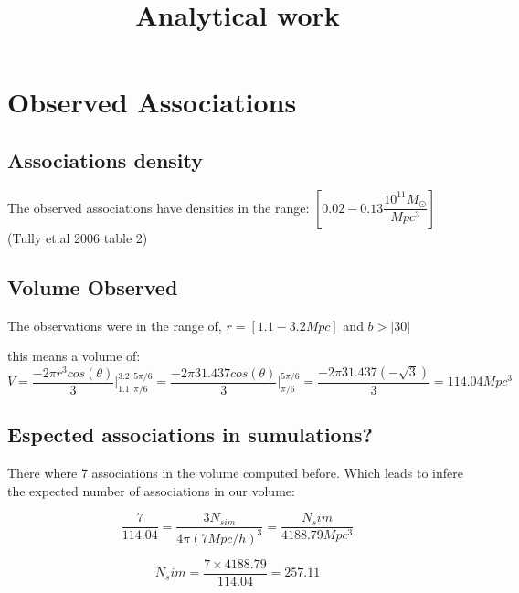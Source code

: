 \documentclass[12pt]{article}
\title{\begin{LARGE}
{Analytical work}
\end{LARGE}}
\begin{document}
\maketitle

\section{Observed Associations}

\subsection{Associations density}

The observed associations have densities in the range: $[0.02-0.13 \dfrac{10^{11}M_{\odot}}{Mpc^3}]$
(Tully et.al 2006 table 2)

\subsection{Volume Observed}

The observations were in the range of, $r = [1.1-3.2 Mpc]$ and $b > |30|$

this means a volume of: 
\begin{equation}
V = \dfrac{-2\pi r^3 cos(\theta)}{3} \bigg|_{1.1}^{3.2} \bigg|_{\pi/6}^{5\pi/6} =  \dfrac{-2\pi 31.437 cos(\theta)}{3} \bigg|_{\pi/6}^{5\pi/6}
= \dfrac{-2 \pi 31.437 (-\sqrt{3})}{3} = 114.04 Mpc^{3}
\end{equation}


\subsection{Espected associations in sumulations?}

There where 7 associations in the volume computed before. Which leads to infere the expected number of associations in our volume:

\begin{equation}
\dfrac{7}{114.04} = \dfrac{3N_{sim}}{4\pi (7Mpc/h)^3} = \dfrac{N_sim}{4188.79 Mpc^3}
\end{equation} 

\begin{equation}
N_sim = \dfrac{7 \times 4188.79}{114.04} = 257.11 
\end{equation}
\end{document}
